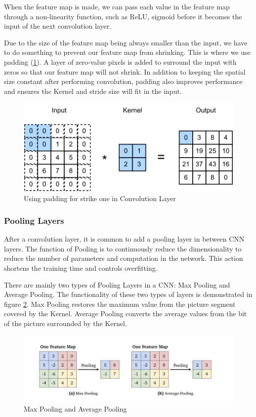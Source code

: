 When the feature map is made, we can pass each value in the feature map through a non-linearity function, such as ReLU, sigmoid before it becomes the input of the next convolution layer.

Due to the size of the feature map being always smaller than the input, we have to do something to prevent our feature map from shrinking. This is where we use padding (\ref{fig:Chap3-CNN_Padding}). A layer of zero-value pixels is added to surround the input with zeros so that our feature map will not shrink. In addition to keeping the spatial size constant after performing convolution, padding also improves performance and ensures the Kernel and stride size will fit in the input.

\begin{figure}[H]
	\centering
	\includegraphics[width=\textwidth]{img/Chap3/CNN_Padding}
	\caption{Using padding for strike one in Convolution Layer}
	\label{fig:Chap3-CNN_Padding}
\end{figure}
\subsubsection{Pooling Layers}

After a convolution layer, it is common to add a pooling layer in between CNN layers. The function of Pooling is to continuously reduce the dimensionality to reduce the number of parameters and computation in the network. This action shortens the training time and controls overfitting.

There are mainly two types of Pooling Layers in a CNN: Max Pooling and Average Pooling. The functionality of these two types of layers is demonstrated in figure \ref{fig:Chap3-CNN_Pooling}. Max Pooling restores the maximum value from the picture segment covered by the Kernel. Average Pooling converts the average values from the bit of the picture surrounded by the Kernel.

\begin{figure}[H]
	\centering
	\includegraphics[width=\textwidth]{img/Chap3/Pooling}
	\caption{Max Pooling and Average Pooling}
	\label{fig:Chap3-CNN_Pooling}
\end{figure}

